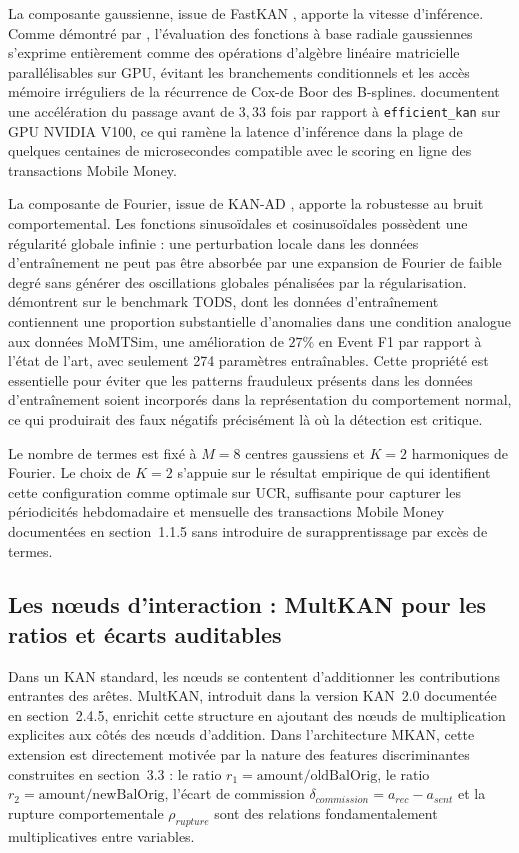 \documentclass[11pt,a4paper,oneside]{report}
\theoremstyle{definition}
\theoremstyle{remark}
\begin{document}
La composante gaussienne, issue de FastKAN \citep{Li2024}, apporte la vitesse d'inférence. Comme démontré par \citet{Li2024}, l'évaluation des fonctions à base radiale gaussiennes s'exprime entièrement comme des opérations d'algèbre linéaire matricielle parallélisables sur GPU, évitant les branchements conditionnels et les accès mémoire irréguliers de la récurrence de Cox-de Boor des B-splines. \citet{Li2024} documentent une accélération du passage avant de $3{,}33$ fois par rapport à \texttt{efficient\_kan} sur GPU NVIDIA V100, ce qui ramène la latence d'inférence dans la plage de quelques centaines de microsecondes compatible avec le scoring en ligne des transactions Mobile Money.

La composante de Fourier, issue de KAN-AD \citep{Zhou2025}, apporte la robustesse au bruit comportemental. Les fonctions sinusoïdales et cosinusoïdales possèdent une régularité globale infinie : une perturbation locale dans les données d'entraînement ne peut pas être absorbée par une expansion de Fourier de faible degré sans générer des oscillations globales pénalisées par la régularisation. \citet{Zhou2025} démontrent sur le benchmark TODS, dont les données d'entraînement contiennent une proportion substantielle d'anomalies dans une condition analogue aux données MoMTSim, une amélioration de $27\%$ en Event F1 par rapport à l'état de l'art, avec seulement 274 paramètres entraînables. Cette propriété est essentielle pour éviter que les patterns frauduleux présents dans les données d'entraînement soient incorporés dans la représentation du comportement normal, ce qui produirait des faux négatifs précisément là où la détection est critique.

Le nombre de termes est fixé à $M = 8$ centres gaussiens et $K = 2$ harmoniques de Fourier. Le choix de $K = 2$ s'appuie sur le résultat empirique de \citet{Zhou2025} qui identifient cette configuration comme optimale sur UCR, suffisante pour capturer les périodicités hebdomadaire et mensuelle des transactions Mobile Money documentées en section~1.1.5 sans introduire de surapprentissage par excès de termes.

\subsection{Les nœuds d'interaction : MultKAN pour les ratios et écarts auditables}

Dans un KAN standard, les nœuds se contentent d'additionner les contributions entrantes des arêtes. MultKAN, introduit dans la version KAN~2.0 documentée en section~2.4.5, enrichit cette structure en ajoutant des nœuds de multiplication explicites aux côtés des nœuds d'addition. Dans l'architecture MKAN, cette extension est directement motivée par la nature des features discriminantes construites en section~3.3 : le ratio $r_1 = \text{amount}/\text{oldBalOrig}$, le ratio $r_2 = \text{amount}/\text{newBalOrig}$, l'écart de commission $\delta_{commission} = a_{rec} - a_{sent}$ et la rupture comportementale $\rho_{rupture}$ sont des relations fondamentalement multiplicatives entre variables.
\end{document}
